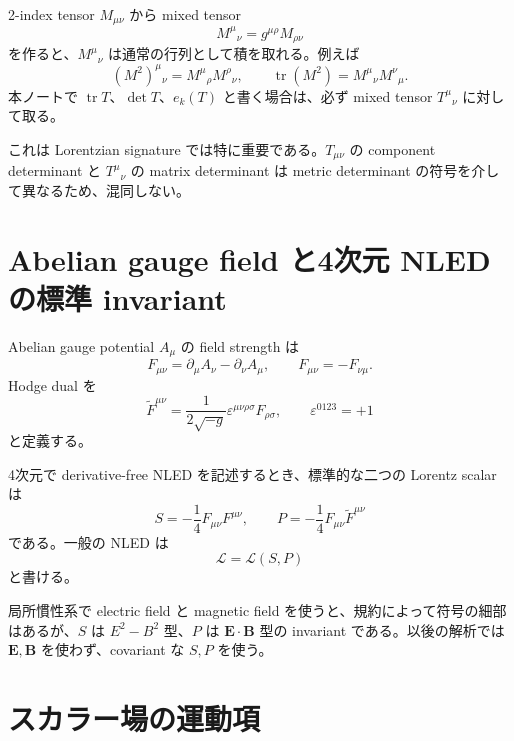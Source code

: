 \documentclass[a4paper,11pt]{ltjsreport}
\newcommand{\tr}{\operatorname{tr}}
\newcommand{\Lag}{\mathcal L}
\newcommand{\eps}{\varepsilon}
\begin{document}
2-index tensor $M_{\mu\nu}$ から mixed tensor
\begin{equation}
 M^\mu{}_{\nu}=g^{\mu\rho}M_{\rho\nu}
 \label{eq:mixed}
\end{equation}
を作ると、$M^\mu{}_{\nu}$ は通常の行列として積を取れる。例えば
\begin{equation}
 (M^2)^\mu{}_{\nu}=M^\mu{}_{\rho}M^\rho{}_{\nu},
 \qquad
 \tr(M^2)=M^\mu{}_{\nu}M^\nu{}_{\mu}.
\end{equation}
本ノートで $\tr T$、$\det T$、$e_k(T)$ と書く場合は、必ず mixed tensor $T^\mu{}_{\nu}$ に対して取る。

これは Lorentzian signature では特に重要である。$T_{\mu\nu}$ の component determinant と $T^\mu{}_{\nu}$ の matrix determinant は metric determinant の符号を介して異なるため、混同しない。

\section{Abelian gauge field と4次元 NLED の標準 invariant}

Abelian gauge potential $A_\mu$ の field strength は
\begin{equation}
 F_{\mu\nu}=\partial_\mu A_\nu-\partial_\nu A_\mu,
 \qquad F_{\mu\nu}=-F_{\nu\mu}.
 \label{eq:Fdef}
\end{equation}
Hodge dual を
\begin{equation}
 \widetilde F^{\mu\nu}
 =\frac{1}{2\sqrt{-g}}\eps^{\mu\nu\rho\sigma}F_{\rho\sigma},
 \qquad \eps^{0123}=+1
 \label{eq:Fdual}
\end{equation}
と定義する。

4次元で derivative-free NLED を記述するとき、標準的な二つの Lorentz scalar は
\begin{equation}
 S=-\frac14F_{\mu\nu}F^{\mu\nu},
 \qquad
 P=-\frac14F_{\mu\nu}\widetilde F^{\mu\nu}
 \label{eq:SP}
\end{equation}
である\cite{Sorokin2021,Ferko2023a}。一般の NLED は
\begin{equation}
 \Lag=\Lag(S,P)
\end{equation}
と書ける。

局所慣性系で electric field と magnetic field を使うと、規約によって符号の細部はあるが、$S$ は $E^2-B^2$ 型、$P$ は $\bm E\cdot\bm B$ 型の invariant である。以後の解析では $\bm E,\bm B$ を使わず、covariant な $S,P$ を使う。

\section{スカラー場の運動項}
\end{document}
